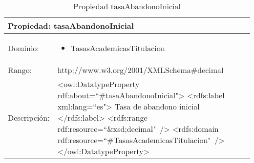 \begin{table}[!ht]
	\centering
	\begin{tabular}{|p{}|p{}|}
		\hline
		\multicolumn{2}{|l|}{Propiedad: \textbf{tasaAbandonoInicial}}
		\\ \hline
		Dominio:&
		\begin{itemize}
			\item TasasAcademicasTitulacion
		\end{itemize}
		\\ \hline
		Rango:&
		http://www.w3.org/2001/XMLSchema\#decimal
		\\ \hline
		Descripción:&
		\textless owl:DatatypeProperty rdf:about=``\#tasaAbandonoInicial"\textgreater\newline 
		\tab\textless rdfs:label xml:lang=``es"\textgreater\newline
		\tab\tab Tasa de abandono inicial\newline
		\tab\textless /rdfs:label\textgreater\newline
		\tab\textless rdfs:range\newline
		\tab\tab rdf:resource=``\&xsd;decimal"\ /\textgreater\newline
		\tab\textless rdfs:domain\newline
		\tab\tab rdf:resource=``\#TasasAcademicasTitulacion"\ /\textgreater\newline
		\textless /owl:DatatypeProperty\textgreater
		\\ \hline
	\end{tabular}
	\caption{Propiedad tasaAbandonoInicial}
	\label{propiedad-tasaabandonoinicial}
\end{table}


